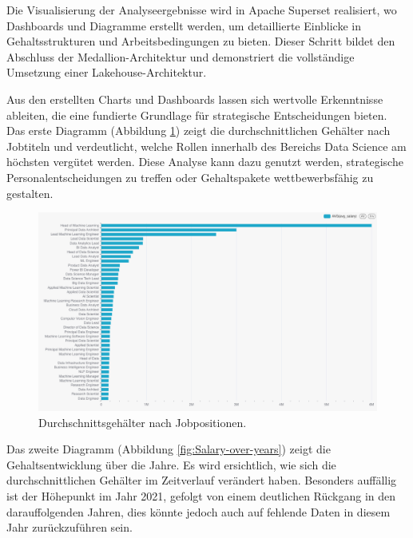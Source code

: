 Die Visualisierung der Analyseergebnisse wird in Apache Superset realisiert, wo Dashboards und Diagramme erstellt werden, um detaillierte Einblicke in Gehaltsstrukturen und Arbeitsbedingungen zu bieten. Dieser Schritt bildet den Abschluss der Medallion-Architektur und demonstriert die vollständige Umsetzung einer Lakehouse-Architektur.

Aus den erstellten Charts und Dashboards lassen sich wertvolle Erkenntnisse ableiten, die eine fundierte Grundlage für strategische Entscheidungen bieten. 
Das erste Diagramm (Abbildung \ref{fig:chart1}) zeigt die durchschnittlichen Gehälter nach Jobtiteln und verdeutlicht, welche Rollen innerhalb des Bereichs Data Science am höchsten vergütet werden. Diese Analyse kann dazu genutzt werden, strategische Personalentscheidungen zu treffen oder Gehaltspakete wettbewerbsfähig zu gestalten.

\begin{figure}[H]
    \centering
    \includegraphics[width=1\linewidth]{graphics/salary-by-job.jpg}
    \caption[Durchschnittsgehälter nach Jobpositionen]{Durchschnittsgehälter nach Jobpositionen.}
    \label{fig:chart1}
\end{figure}

Das zweite Diagramm (Abbildung \ref{fig:Salary-over-years}) zeigt die Gehaltsentwicklung über die Jahre. Es wird ersichtlich, wie sich die durchschnittlichen Gehälter im Zeitverlauf verändert haben. Besonders auffällig ist der Höhepunkt im Jahr 2021, gefolgt von einem deutlichen Rückgang in den darauffolgenden Jahren, dies könnte jedoch auch auf fehlende Daten in diesem Jahr zurückzuführen sein. 


